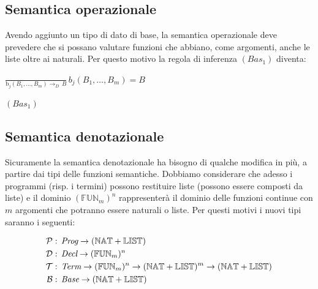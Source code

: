 		\subsection{Semantica operazionale}
		
		\qquad Avendo aggiunto un tipo di dato di base, la semantica operazionale deve prevedere che si possano valutare funzioni che abbiano, come argomenti, anche le liste oltre ai naturali. Per questo motivo la regola di inferenza $(Bas_1)$ diventa:\\
		\begin{minipage}{0.7\linewidth}
			\vspace{5 mm}
			\begin{flushleft}
				$\frac{}{\text{b}_j(B_1,\dots,B_m)\rightarrow_D \, B} \, b_j(B_1,\dots,B_m) = B$\\
			\end{flushleft}
		\end{minipage}
		\hfill
		\begin{minipage}{0.2\linewidth}
			\vspace{5 mm}
			\begin{flushright}
				$(Bas_1)$\\
			\end{flushright}
		\end{minipage}
		
		\subsection{Semantica denotazionale}
		
		\qquad Sicuramente la semantica denotazionale ha bisogno di qualche modifica in pi\`{u}, a partire dai tipi delle funzioni semantiche. Dobbiamo considerare che adesso i programmi (risp. i termini) possono restituire liste (possono essere composti da liste) e il dominio $(\mathbb{FUN}_m)^n$ rappresenter\`{a} il dominio delle funzioni continue con $m$ argomenti che potranno essere naturali o liste. Per questi motivi i nuovi tipi saranno i seguenti:
		
		\begin{align*}
		\mathcal{P} & : \, \emph{Prog}\rightarrow (\mathbb{NAT}+\mathbb{LIST})\\
		\mathcal{D} & : \, \emph{Decl}\rightarrow (\mathbb{FUN}_m)^n\\
		\mathcal{T} & : \, \emph{Term}\rightarrow (\mathbb{FUN}_m)^n \rightarrow (\mathbb{NAT} + \mathbb{LIST})^m\rightarrow (\mathbb{NAT}+\mathbb{LIST})\\
		\mathcal{B} & : \, \emph{Base} \rightarrow (\mathbb{NAT}+\mathbb{LIST})\\
		\end{align*}
		
